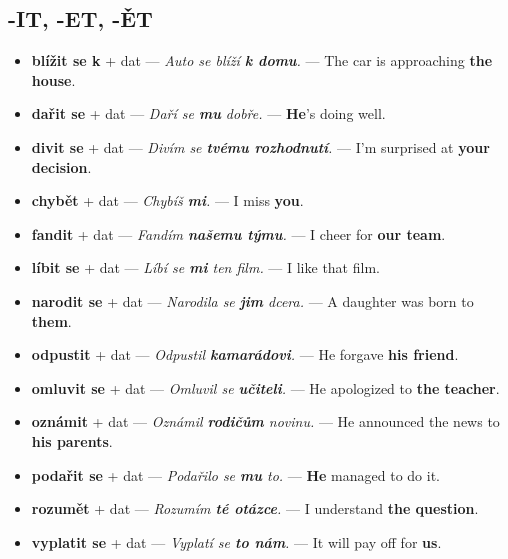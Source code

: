 \documentclass[12pt]{book}
\begin{document}
\subsection*{-IT, -ET, -ĚT}
\begin{itemize}
    \item \textbf{blížit se k} + dat --- \textit{Auto se blíží \textbf{k domu}.} --- The car is approaching \textbf{the house}.
    \item \textbf{dařit se} + dat --- \textit{Daří se \textbf{mu} dobře.} --- \textbf{He}'s doing well.
    \item \textbf{divit se} + dat --- \textit{Divím se \textbf{tvému rozhodnutí}.} --- I'm surprised at \textbf{your decision}.
    \item \textbf{chybět} + dat --- \textit{Chybíš \textbf{mi}.} --- I miss \textbf{you}.
    \item \textbf{fandit} + dat --- \textit{Fandím \textbf{našemu týmu}.} --- I cheer for \textbf{our team}.
    \item \textbf{líbit se} + dat --- \textit{Líbí se \textbf{mi} ten film.} --- I like that film.
    \item \textbf{narodit se} + dat --- \textit{Narodila se \textbf{jim} dcera.} --- A daughter was born to \textbf{them}.
    \item \textbf{odpustit} + dat --- \textit{Odpustil \textbf{kamarádovi}.} --- He forgave \textbf{his friend}.
    \item \textbf{omluvit se} + dat --- \textit{Omluvil se \textbf{učiteli}.} --- He apologized to \textbf{the teacher}.
    \item \textbf{oznámit} + dat --- \textit{Oznámil \textbf{rodičům} novinu.} --- He announced the news to \textbf{his parents}.
    \item \textbf{podařit se} + dat --- \textit{Podařilo se \textbf{mu} to.} --- \textbf{He} managed to do it.
    \item \textbf{rozumět} + dat --- \textit{Rozumím \textbf{té otázce}.} --- I understand \textbf{the question}.
    \item \textbf{vyplatit se} + dat --- \textit{Vyplatí se \textbf{to nám}.} --- It will pay off for \textbf{us}.
\end{itemize}
\end{document}
